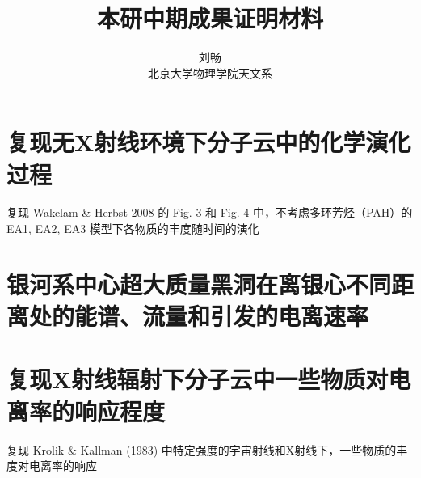 \documentclass[UTF8]{article}
\begin{document}
	\title{\heiti 本研中期成果证明材料}
	\author{\songti 刘畅\\北京大学物理学院天文系}
	\date{}
	\maketitle
\begin{fangsong}
\section{复现无X射线环境下分子云中的化学演化过程}
复现 Wakelam \& Herbst 2008 的 Fig. 3 和 Fig. 4 中，不考虑多环芳烃（PAH）的 EA1, EA2, EA3 模型下各物质的丰度随时间的演化
\section{银河系中心超大质量黑洞在离银心不同距离处的能谱、流量和引发的电离速率}
\section{复现X射线辐射下分子云中一些物质对电离率的响应程度}
复现 Krolik \& Kallman (1983) 中特定强度的宇宙射线和X射线下，一些物质的丰度对电离率的响应 
\end{fangsong}
\end{document}
